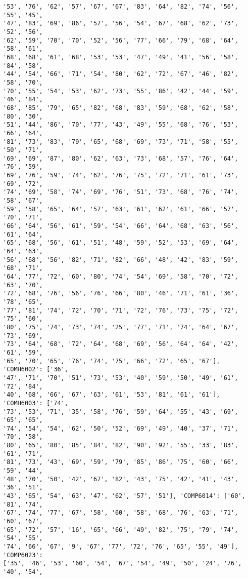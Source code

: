 \documentclass[11pt]{article}
\begin{document}
\begin{Verbatim}[commandchars=\\\{\}]
'53', '76', '62', '57', '67', '67', '83', '64', '82', '74', '56', '55', '45',
'47', '83', '69', '86', '57', '56', '54', '67', '68', '62', '73', '52', '56',
'62', '59', '70', '70', '52', '56', '77', '66', '79', '68', '64', '58', '61',
'68', '68', '61', '68', '53', '53', '47', '49', '41', '56', '58', '84', '58',
'44', '54', '66', '71', '54', '80', '62', '72', '67', '46', '82', '58', '70',
'70', '55', '54', '53', '62', '73', '55', '86', '42', '44', '59', '46', '84',
'68', '85', '79', '65', '82', '68', '83', '59', '68', '62', '58', '80', '30',
'51', '44', '86', '70', '77', '43', '49', '55', '68', '76', '53', '66', '64',
'81', '73', '83', '79', '65', '68', '69', '73', '71', '58', '55', '50', '71',
'69', '69', '87', '80', '62', '63', '73', '68', '57', '76', '64', '76', '59',
'69', '76', '59', '74', '62', '76', '75', '72', '71', '61', '73', '69', '72',
'74', '69', '58', '74', '69', '76', '51', '73', '68', '76', '74', '58', '67',
'59', '58', '65', '64', '57', '63', '61', '62', '61', '66', '57', '70', '71',
'66', '64', '56', '61', '59', '54', '66', '64', '68', '63', '56', '61', '64',
'65', '68', '56', '61', '51', '48', '59', '52', '53', '69', '64', '64', '63',
'56', '68', '56', '82', '71', '82', '66', '48', '42', '83', '59', '68', '71',
'64', '77', '72', '60', '80', '74', '54', '69', '58', '70', '72', '63', '70',
'72', '68', '76', '56', '76', '66', '80', '46', '71', '61', '36', '78', '65',
'77', '81', '74', '72', '70', '71', '72', '76', '73', '75', '72', '75', '60',
'80', '75', '74', '73', '74', '25', '77', '71', '74', '64', '67', '73', '69',
'73', '64', '68', '72', '64', '68', '69', '56', '64', '64', '42', '61', '59',
'65', '70', '65', '76', '74', '75', '66', '72', '65', '67'], 'COMH6002': ['36',
'47', '71', '70', '51', '73', '53', '40', '59', '50', '49', '61', '72', '84',
'40', '68', '66', '67', '63', '61', '53', '81', '61', '61'], 'COMH6003': ['74',
'73', '53', '71', '35', '58', '76', '59', '64', '55', '43', '69', '65', '65',
'74', '54', '54', '62', '50', '52', '69', '49', '40', '37', '71', '70', '58',
'80', '65', '80', '85', '84', '82', '90', '92', '55', '33', '83', '61', '71',
'81', '73', '43', '69', '59', '79', '85', '86', '75', '60', '66', '59', '44',
'48', '70', '50', '42', '67', '82', '43', '75', '42', '41', '43', '36', '51',
'43', '65', '54', '63', '47', '62', '57', '51'], 'COMP6014': ['60', '81', '74',
'67', '74', '77', '67', '58', '60', '58', '68', '76', '63', '71', '60', '67',
'65', '72', '57', '16', '65', '66', '49', '82', '75', '79', '74', '54', '55',
'74', '66', '67', '9', '67', '77', '72', '76', '65', '55', '49'], 'COMP6023':
['35', '46', '53', '60', '54', '67', '54', '49', '50', '24', '76', '40', '54',

\end{Verbatim}
\end{document}
